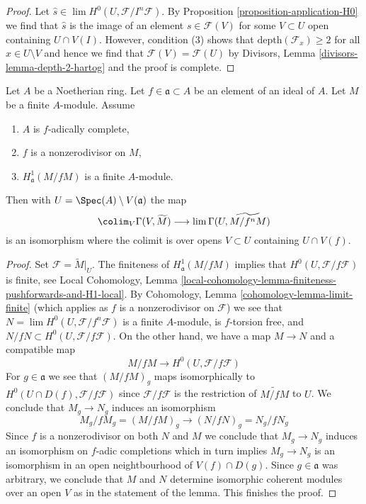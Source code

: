 \begin{proof}
Let $\hat s \in \lim H^0(U, \mathcal{F}/I^n\mathcal{F})$.
By Proposition \ref{proposition-application-H0}
we find that $\hat s$ is the image of an element $s \in \mathcal{F}(V)$
for some $V \subset U$ open containing $U \cap V(I)$.
However, condition (3) shows that $\text{depth}(\mathcal{F}_x) \geq 2$
for all $x \in U \setminus V$ and hence we find that
$\mathcal{F}(V) = \mathcal{F}(U)$ by
Divisors, Lemma \ref{divisors-lemma-depth-2-hartog}
and the proof is complete.
\end{proof}

\begin{lemma}
\label{lemma-alternative-colim-H0}
Let $A$ be a Noetherian ring. Let $f \in \mathfrak a \subset A$
be an element of an ideal of $A$. Let $M$ be a finite $A$-module.
Assume
\begin{enumerate}
\item $A$ is $f$-adically complete,
\item $f$ is a nonzerodivisor on $M$,
\item $H^1_\mathfrak a(M/fM)$ is a finite $A$-module.
\end{enumerate}
Then with $U = \Spec(A) \setminus V(\mathfrak a)$ the map
$$
\colim_V \Gamma(V, \widetilde{M})
\longrightarrow
\lim \Gamma(U, \widetilde{M/f^nM})
$$
is an isomorphism where the colimit is over opens $V \subset U$
containing $U \cap V(f)$.
\end{lemma}

\begin{proof}
Set $\mathcal{F} = \widetilde{M}|_U$.
The finiteness of $H^1_\mathfrak a(M/fM)$ implies that
$H^0(U, \mathcal{F}/f\mathcal{F})$ is finite, see
Local Cohomology, Lemma
\ref{local-cohomology-lemma-finiteness-pushforwards-and-H1-local}.
By Cohomology, Lemma \ref{cohomology-lemma-limit-finite}
(which applies as $f$ is a nonzerodivisor on $\mathcal{F}$)
we see that $N = \lim H^0(U, \mathcal{F}/f^n\mathcal{F})$
is a finite $A$-module, is $f$-torsion free, and
$N/fN \subset H^0(U, \mathcal{F}/f\mathcal{F})$.
On the other hand, we have a map $M \to N$ and a compatible map
$$
M/fM \longrightarrow H^0(U, \mathcal{F}/f\mathcal{F})
$$
For $g \in \mathfrak a$ we see that $(M/fM)_g$ maps isomorphically
to $H^0(U \cap D(f), \mathcal{F}/f\mathcal{F})$ since
$\mathcal{F}/f\mathcal{F}$ is the restriction of $\widetilde{M/fM}$ to $U$.
We conclude that $M_g \to N_g$ induces an isomorphism
$$
M_g/fM_g = (M/fM)_g \to (N/fN)_g = N_g/fN_g
$$
Since $f$ is a nonzerodivisor on both $N$ and $M$ we conclude
that $M_g \to N_g$ induces an isomorphism on $f$-adic completions
which in turn implies $M_g \to N_g$ is an isomorphism in an open
neightbourhood of $V(f) \cap D(g)$.
Since $g \in \mathfrak a$ was arbitrary, we conclude that $M$ and $N$
determine isomorphic coherent modules over an open $V$
as in the statement of the lemma. This finishes the proof.
\end{proof}

